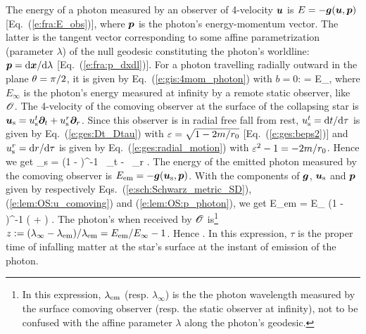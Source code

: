 The energy of a photon measured by an observer of 4-velocity $\bm{u}$ is
$E = - \bm{g}(\bm{u},\bm{p})$ [Eq.~(\ref{e:fra:E_obs})], where $\bm{p}$ is the photon's
energy-momentum vector. The latter is the tangent vector corresponding to
some affine parametrization (parameter $\lambda$) of
the null geodesic constituting the photon's worldline: $\bm{p} = \mathrm{d}\bm{x}/\mathrm{d}\lambda$
[Eq.~(\ref{e:fra:p_dxdl})].
For a photon travelling radially outward in the plane $\theta=\pi/2$, it is given
by Eq.~(\ref{e:gis:4mom_photon}) with $b=0$:
\be \label{e:lem:OS:p_photon}
      = E_\infty  {} ,
\ee
where $E_\infty$ is the photon's energy measured at infinity by a remote static observer,
like $\mathscr{O}$.
The 4-velocity of the comoving observer at the surface of the collapsing star
is $\bm{u}_{\rm s} = u_{\rm s}^t \bm{\partial}_t + u_{\rm s}^r \bm{\partial}_r$. Since this observer is in radial free fall
from rest,
$u_{\rm s}^t=\mathrm{d} t / \mathrm{d}\tau$ is given by Eq.~(\ref{e:ges:Dt_Dtau})
with $\varepsilon = \sqrt{1 - 2m/r_0}$ [Eq.~(\ref{e:ges:beps2})]
and $u_{\rm s}^r = \mathrm{d} r /\mathrm{d}\tau$ is given by
Eq.~(\ref{e:ges:radial_motion}) with $\varepsilon^2 - 1 = - 2m/r_0$.
Hence we get
\be \label{e:lem:OS:u_comoving}
    _{\rm s} = 
         \left(1 -  \right)^{-1} \, \wpar_t
        -  \,
        \wpar_r .
\ee
The energy of the emitted photon measured by the comoving observer
is $E_{\rm em} = -\bm{g}(\bm{u}_{\rm s},\bm{p})$. With the components of $\bm{g}$,
$\bm{u}_{\rm s}$ and $\bm{p}$ given by respectively Eqs.~(\ref{e:sch:Schwarz_metric_SD}),
(\ref{e:lem:OS:u_comoving}) and (\ref{e:lem:OS:p_photon}), we get
\be
    E_{\rm em} = E_\infty
    \left(1 -  \right)^{-1}
    \left(  + 
    \right) .
\ee
The photon's  when received by $\mathscr{O}$ is\footnote{In this expression,
$\lambda_{\rm em}$ (resp. $\lambda_\infty$) is the the photon wavelength measured by
the surface comoving observer (resp. the static observer at infinity), not to be confused with
the affine parameter $\lambda$ along the photon's geodesic.}
$z := (\lambda_\infty - \lambda_{\rm em})/\lambda_{\rm em} = E_{\rm em}/E_\infty - 1$.
Hence
\be \label{e:lem:OS:redshift}
     .
\ee
In this expression, $\tau$ is the proper time of infalling matter at the star's surface at the
instant of emission of the photon.

